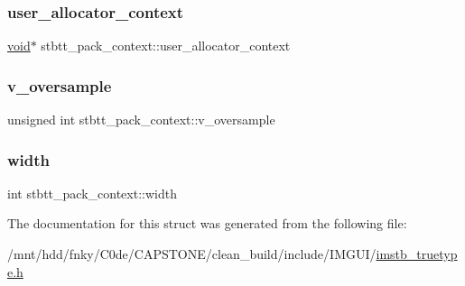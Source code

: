 \subsubsection{\texorpdfstring{user\+\_\+allocator\+\_\+context}{user\_allocator\_context}}
{\footnotesize\ttfamily \hyperlink{imgui__impl__opengl3__loader_8h_ac668e7cffd9e2e9cfee428b9b2f34fa7}{void}$\ast$ stbtt\+\_\+pack\+\_\+context\+::user\+\_\+allocator\+\_\+context}

\mbox{\label{structstbtt__pack__context_a4b55efa27ef36e7f258afe92921784c0}} 
\subsubsection{\texorpdfstring{v\+\_\+oversample}{v\_oversample}}
{\footnotesize\ttfamily unsigned int stbtt\+\_\+pack\+\_\+context\+::v\+\_\+oversample}

\mbox{\label{structstbtt__pack__context_a5da0b7b5d3b82d5fc75ea1c8945183fa}} 
\subsubsection{\texorpdfstring{width}{width}}
{\footnotesize\ttfamily int stbtt\+\_\+pack\+\_\+context\+::width}



The documentation for this struct was generated from the following file\+:\begin{DoxyCompactItemize}
\item 
/mnt/hdd/fnky/\+C0de/\+C\+A\+P\+S\+T\+O\+N\+E/clean\+\_\+build/include/\+I\+M\+G\+U\+I/\hyperlink{imstb__truetype_8h}{imstb\+\_\+truetype.\+h}\end{DoxyCompactItemize}
